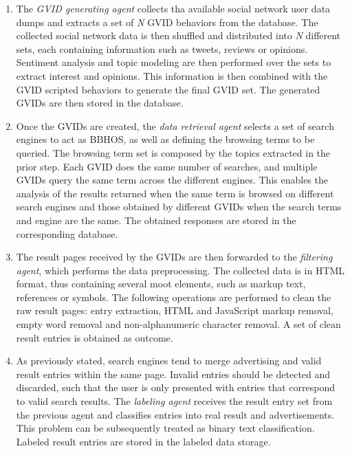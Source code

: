 \begin{enumerate}[label=\Roman*.]
    \item The \textit{GVID generating agent} collects tha available social network user data dumps and extracts a set of \textit{N} GVID behaviors from the database. The collected social network data is then shuffled and distributed into \textit{N} different sets, each containing information such as tweets, reviews or opinions. Sentiment analysis and topic modeling are then performed over the sets to extract interest and opinions. This information is then combined with the GVID scripted behaviors to generate the final GVID set. The generated GVIDs are then stored in the database.
    
    \item Once the GVIDs are created, the \textit{data retrieval agent} selects a set of search engines to act as BBHOS, as well as defining the browsing terms to be queried. The browsing term set is composed by the topics extracted in the prior step. Each GVID does the same number of searches, and multiple GVIDs query the same term across the different engines. This enables the analysis of the results returned when the same term is browsed on different search engines and those obtained by different GVIDs when the search terms and engine are the same. The obtained responses are stored in the corresponding database.
    
    \item The result pages received by the GVIDs are then forwarded to the \textit{filtering agent}, which performs the data preprocessing. The collected data is in HTML format, thus containing several moot elements, such as markup text, references or symbols. The following operations are performed to clean the raw result pages: entry extraction, HTML and JavaScript markup removal, empty word removal and non-alphanumeric character removal. A set of clean result entries is obtained as outcome.
    
    \item As previously stated, search engines tend to merge advertising and valid result entries within the same page. Invalid entries should be detected and discarded, such that the user is only presented with entries that correspond to valid search results. The \textit{labeling agent} receives the result entry set from the previous agent and classifies entries into real result and advertisements. This problem can be subsequently treated as binary text classification. Labeled result entries are stored in the labeled data storage.
    

\end{enumerate}
